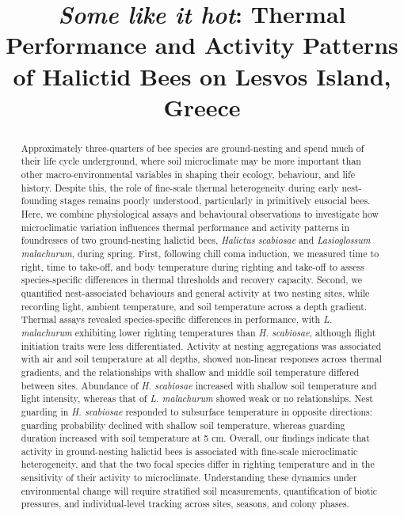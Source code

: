 \documentclass[11pt,a4paper]{article}
\begin{document}
\title{\textbf{\textit{Some like it hot}: Thermal Performance and Activity Patterns of Halictid Bees on Lesvos Island, Greece}}

\date{}

\maketitle

\begin{abstract}
Approximately three-quarters of bee species are ground-nesting and spend much of their life cycle underground, where soil microclimate may be more important than other macro-environmental variables in shaping their ecology, behaviour, and life history. Despite this, the role of fine-scale thermal heterogeneity during early nest-founding stages remains poorly understood, particularly in primitively eusocial bees. Here, we combine physiological assays and behavioural observations to investigate how microclimatic variation influences thermal performance and activity patterns in foundresses of two ground-nesting halictid bees, \textit{Halictus scabiosae} and \textit{Lasioglossum malachurum}, during spring. First, following chill coma induction, we measured time to right, time to take-off, and body temperature during righting and take-off to assess species-specific differences in thermal thresholds and recovery capacity. Second, we quantified nest-associated behaviours and general activity at two nesting sites, while recording light, ambient temperature, and soil temperature across a depth gradient. Thermal assays revealed species-specific differences in performance, with \textit{L. malachurum} exhibiting lower righting temperatures than \textit{H. scabiosae}, although flight initiation traits were less differentiated. Activity at nesting aggregations was associated with air and soil temperature at all depths, showed non-linear responses across thermal gradients, and the relationships with shallow and middle soil temperature differed between sites. Abundance of \textit{H. scabiosae} increased with shallow soil temperature and light intensity, whereas that of \textit{L. malachurum} showed weak or no relationships. Nest guarding in \textit{H. scabiosae} responded to subsurface temperature in opposite directions: guarding probability declined with shallow soil temperature, whereas guarding duration increased with soil temperature at 5 cm. Overall, our findings indicate that activity in ground-nesting halictid bees is associated with fine-scale microclimatic heterogeneity, and that the two focal species differ in righting temperature and in the sensitivity of their activity to microclimate. Understanding these dynamics under environmental change will require stratified soil measurements, quantification of biotic pressures, and individual-level tracking across sites, seasons, and colony phases. 
\end{abstract}
\end{document}
